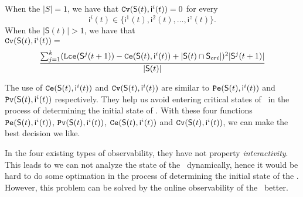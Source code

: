 \begin{definition} 
When the $|S|=1$, we have that
${\tt Cv}(\mathsf{S}(t), \mathsf{ i}^{i}(t))=0$ for every  \[\mathsf{ i}^{i}(t) \in \{\mathsf{ i}^{1}(t),\mathsf{ i}^{2}(t),\ldots, \mathsf{ i}^{z}(t)\}.\]   When the $|\mathsf{S}(t)|>1$, 
we have that  \\
${\tt Cv}(\mathsf{S}(t), \mathsf{ i}^{i}(t))=$
$$\frac{\sum_{j=1}^k ({\tt Lce}(\mathsf{S}^{j}(t+1))-{\tt Ce}(\mathsf{S}(t), \mathsf{ i}^{i}(t))+|\mathsf{S}(t) \cap \mathsf{S}_{cri}|)^2 |\mathsf{S}^{j}(t+1)|}{ |\mathsf{S}(t)|}$$
\end{definition}

The use of ${\tt Ce}(\mathsf{S}(t), \mathsf{ i}^{i}(t))$ and ${\tt Cv}(\mathsf{S}(t), \mathsf{ i}^{i}(t))$ are similar to ${\tt Pe}(\mathsf{S}(t), \mathsf{ i}^{i}(t))$ and ${\tt Pv}(\mathsf{S}(t), \mathsf{ i}^{i}(t))$ respectively. They help us avoid entering critical states of \BCNs\ in the process of determining the initial state of \BCNs. With these four functions ${\tt Pe}(\mathsf{S}(t), \mathsf{ i}^{i}(t))$, ${\tt Pv}(\mathsf{S}(t), \mathsf{ i}^{i}(t))$, ${\tt Ce}(\mathsf{S}(t), \mathsf{ i}^{i}(t))$ and ${\tt Cv}(\mathsf{S}(t), \mathsf{ i}^{i}(t))$, we can make the best decision we like. 

In the four existing types of observability, they have not property {\em interactivity}. This leads to we can not analyze the state of the \BCNs\ dynamically, hence it would be hard to do some optimation in the process of determining the initial state of the \BCNs. However, this problem can be solved by the online observability of the \BCNs\ better.